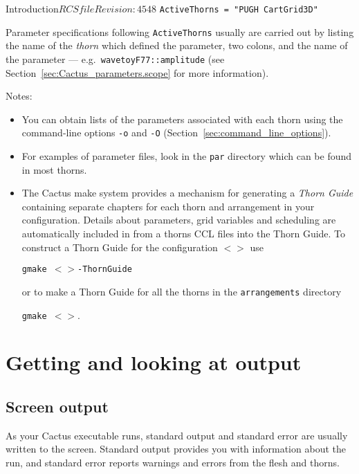 \begin{cactuspart}{Introduction}{$RCSfile$}{$Revision: 4548 $}
\texttt{ActiveThorns = "PUGH CartGrid3D"}

Parameter specifications following \texttt{ActiveThorns} usually are
carried out by listing
the name of the \textit{thorn} which defined the parameter, two colons,
and the name of the parameter --- e.g.~\texttt{wavetoyF77::amplitude}
(see Section~\ref{sec:Cactus_parameters.scope} for more information).

Notes:

\begin{itemize}

\item{} You can obtain lists of the parameters associated with
each thorn using the command-line options \texttt{-o} and \texttt{-O}
(Section~\ref{sec:command_line_options}).

\item{} For examples of parameter files, look in the \texttt{par} directory
        which can be found in most thorns.

\item {}
The Cactus make system provides a mechanism for generating a
\textit{Thorn Guide} containing separate chapters for each thorn and
arrangement in your configuration. 
Details about parameters, grid variables and scheduling are
automatically included in from a thorns CCL files into the Thorn
Guide. To construct a Thorn Guide for the configuration
\texttt{$<$$>$} use

\texttt{gmake $<$$>$-ThornGuide}

or to make a Thorn Guide for all the thorns in the \texttt{arrangements} directory

\texttt{gmake $<$$>$}.

\end{itemize}



\chapter{Getting and looking at output}


\section{Screen output}

As your Cactus executable runs, standard output and standard error
are usually written to the screen. Standard output provides you
with information about the run, and standard error reports warnings
and errors from the flesh and thorns.


\end{cactuspart}
